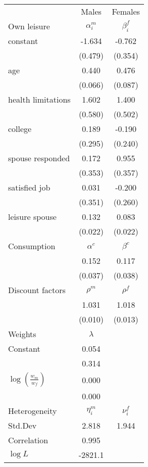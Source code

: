 \begin{tabular}{lcc} 
\hline\hline 
 & Males & Females \\ 
Own leisure & $\alpha_{i}^{m}$ & $\beta_{i}^{f}$ \\ 
constant & -1.634 & -0.762 \\ 
 & (0.479) & (0.354) \\ 
age & 0.440 & 0.476 \\ 
 & (0.066) & (0.087) \\ 
health limitations & 1.602 & 1.400 \\ 
 & (0.580) & (0.502) \\ 
college & 0.189 & -0.190 \\ 
 & (0.295) & (0.240) \\ 
spouse responded & 0.172 & 0.955 \\ 
 & (0.353) & (0.357) \\ 
satisfied job & 0.031 & -0.200 \\ 
 & (0.351) & (0.260) \\ 
leisure spouse & 0.132 & 0.083 \\ 
 & (0.022) & (0.022) \\ 
Consumption & $\alpha^{c}$ & $\beta^{c}$ \\ 
 & 0.152 & 0.117 \\ 
 & (0.037) & (0.038) \\ 
Discount factors & $\rho^m$ & $\rho^f$ \\ 
 & 1.031 & 1.018 \\ 
 & (0.010) & (0.013) \\ 
Weights & $\lambda$ &  \\ 
Constant & 0.054 &  \\ 
 & 0.314 &  \\ 
$\log(\frac{w_m}{w_f})$ & 0.000 &  \\ 
 & 0.000 &  \\ 
Heterogeneity & $\eta_i^m$ & $\nu_i^f$ \\ 
Std.Dev & 2.818 & 1.944 \\ 
Correlation & 0.995 &  \\ 
\hline 
$\log L$ & -2821.1 & \\ 
\hline \hline 
\end{tabular} 
